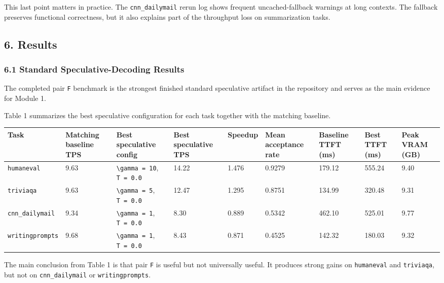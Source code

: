 \documentclass[
]{article}
\newcounter{none} %
\begin{document}
This last point matters in practice. The \texttt{cnn\_dailymail} rerun
log shows frequent uncached-fallback warnings at long contexts. The
fallback preserves functional correctness, but it also explains part of
the throughput loss on summarization tasks.

\subsection{6. Results}\label{6-results}

\subsubsection{6.1 Standard Speculative-Decoding
Results}\label{61-standard-speculative-decoding-results}

The completed pair \texttt{F} benchmark is the strongest finished
standard speculative artifact in the repository and serves as the main
evidence for Module 1.

Table 1 summarizes the best speculative configuration for each task
together with the matching baseline.

{\def\LTcaptype{none} %
\begin{longtable}[]{@{}lllllllll@{}}
\toprule\noalign{}
Task & Matching baseline TPS & Best speculative config & Best
speculative TPS & Speedup & Mean acceptance rate & Baseline TTFT (ms) &
Best TTFT (ms) & Peak VRAM (GB) \\
\midrule\noalign{}
\endhead
\bottomrule\noalign{}
\endlastfoot
\texttt{humaneval} & 9.63 & \texttt{\textbackslash{}gamma\ =\ 10},
\texttt{T\ =\ 0.0} & 14.22 & 1.476 & 0.9279 & 179.12 & 555.24 & 9.40 \\
\texttt{triviaqa} & 9.63 & \texttt{\textbackslash{}gamma\ =\ 5},
\texttt{T\ =\ 0.0} & 12.47 & 1.295 & 0.8751 & 134.99 & 320.48 & 9.31 \\
\texttt{cnn\_dailymail} & 9.34 & \texttt{\textbackslash{}gamma\ =\ 1},
\texttt{T\ =\ 0.0} & 8.30 & 0.889 & 0.5342 & 462.10 & 525.01 & 9.77 \\
\texttt{writingprompts} & 9.68 & \texttt{\textbackslash{}gamma\ =\ 1},
\texttt{T\ =\ 0.0} & 8.43 & 0.871 & 0.4525 & 142.32 & 180.03 & 9.32 \\
\end{longtable}
}

The main conclusion from Table 1 is that pair \texttt{F} is useful but
not universally useful. It produces strong gains on \texttt{humaneval}
and \texttt{triviaqa}, but not on \texttt{cnn\_dailymail} or
\texttt{writingprompts}.
\end{document}
